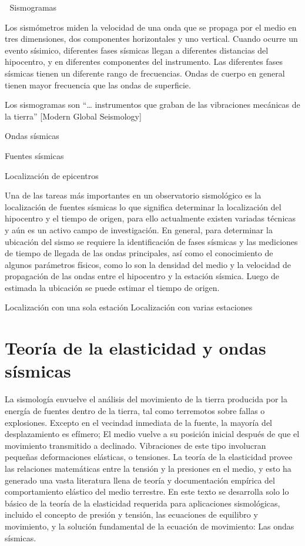 
Sismogramas

Los sismómetros miden la velocidad de una onda que se propaga por el medio en
tres dimensiones, dos componentes horizontales y uno vertical. Cuando ocurre un
evento sísimico, diferentes fases sísmicas llegan a diferentes distancias del
hipocentro, y en diferentes componentes del instrumento. Las diferentes fases
sísmicas tienen un diferente rango de frecuencias. Ondas de cuerpo en general
tienen mayor frecuencia que las ondas de superficie.

Los sismogramas son “… instrumentos que graban de las vibraciones mecánicas de
la tierra” [Modern Global Seismology]

Ondas sísmicas

Fuentes sísmicas

Localización de epicentros

Una de las tareas más importantes en un observatorio sismológico es la
localización de fuentes sísmicas lo que significa determinar la localización del
hipocentro y el tiempo de origen, para ello actualmente existen variadas
técnicas y aún es un activo campo de investigación. En general, para determinar
la ubicación del sismo se requiere la identificación de fases sísmicas y las
mediciones de tiempo de llegada de las ondas principales, así como el
conocimiento de algunos parámetros físicos, como lo son la densidad del medio y
la velocidad de propagación de las ondas entre el hipocentro y la estación
sísmica. Luego de estimada la ubicación se puede estimar el tiempo de origen.

Localización con una sola estación Localización con varias estaciones



% 
% 


\section{Teoría de la elasticidad y ondas sísmicas}

La sismología envuelve el análisis del movimiento de la tierra producida por la
energía de fuentes dentro de la tierra, tal como terremotos sobre fallas o
explosiones. Excepto en el vecindad inmediata de la fuente, la mayoría del
desplazamiento es efímero; El medio vuelve a su posición inicial después  de que
el movimiento transmitido a declinado. Vibraciones de este tipo involucran
pequeñas deformaciones elásticas, o tensiones. La teoría de la elasticidad
provee las relaciones matemáticas entre la tensión y la presiones en el medio, y
esto ha generado una vasta literatura llena de teoría y documentación empírica
del comportamiento elástico del medio terrestre. En este texto se desarrolla
solo lo básico de la teoría de la elasticidad requerida para aplicaciones
sismológicas, incluido el concepto de presión y tensión, las ecuaciones de
equilibro y movimiento, y la solución fundamental de la ecuación de movimiento:
Las ondas sísmicas.

